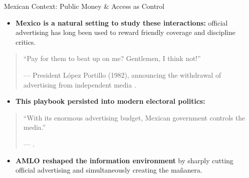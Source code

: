 \documentclass[10pt,aspectratio=169]{beamer}
\begin{document}
\begin{frame}{Mexican Context: Public Money \& Access as Control}

\begin{itemize}
    \setlength\itemsep{0.55em}

    \item \textbf{Mexico is a natural setting to study these interactions:}
    official advertising has long been used to \alert{reward} friendly coverage and \alert{discipline} critics.

\end{itemize}

\vspace{0.2cm}
\begin{quote}
\centering
``Pay for them to beat up on me? Gentlemen, I think not!''

\hfill --- \tiny{President L\'opez Portillo (1982), announcing the withdrawal of advertising from independent media \citep{PrensaVendida-Rod}.}
\end{quote}

\begin{itemize}
    \setlength\itemsep{0.55em}

    \item \textbf{This playbook persisted into modern electoral politics:}
\end{itemize}

\vspace{0.2cm}
\begin{quote}
\centering
``With its enormous advertising budget, Mexican government controls the media.''

\hfill --- \tiny{\citep{Times}.}
\end{quote}

\begin{itemize}
    \setlength\itemsep{0.55em}

    \item \textbf{AMLO reshaped the information environment}
    by sharply cutting official advertising and simultaneously creating the \alert{ma\~nanera}.
\end{itemize}

\end{frame}
\end{document}
